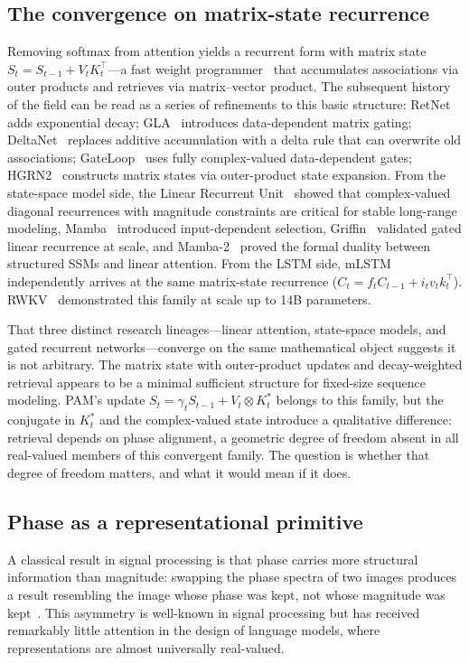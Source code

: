 \documentclass[11pt]{article}
\begin{document}
\subsection{The convergence on matrix-state recurrence}
Removing softmax from attention yields a recurrent form with matrix state $S_t = S_{t-1} + V_t K_t^\top$---a fast weight programmer~\cite{schmidhuber1992learning,schlag2021linear} that accumulates associations via outer products and retrieves via matrix--vector product. The subsequent history of the field can be read as a series of refinements to this basic structure: RetNet~\cite{sun2023retentive} adds exponential decay; GLA~\cite{yang2024gated} introduces data-dependent matrix gating; DeltaNet~\cite{yang2024deltanet} replaces additive accumulation with a delta rule that can overwrite old associations; GateLoop~\cite{katsch2024gateloop} uses fully complex-valued data-dependent gates; HGRN2~\cite{qin2024hgrn2} constructs matrix states via outer-product state expansion. From the state-space model side, the Linear Recurrent Unit~\cite{orvieto2023resurrecting} showed that complex-valued diagonal recurrences with magnitude constraints are critical for stable long-range modeling, Mamba~\cite{gu2023mamba} introduced input-dependent selection, Griffin~\cite{de2024griffin} validated gated linear recurrence at scale, and Mamba-2~\cite{dao2024transformers} proved the formal duality between structured SSMs and linear attention. From the LSTM side, mLSTM~\cite{beck2024xlstm} independently arrives at the same matrix-state recurrence ($C_t = f_t C_{t-1} + i_t v_t k_t^\top$). RWKV~\cite{peng2023rwkv,peng2024eagle} demonstrated this family at scale up to 14B parameters.

That three distinct research lineages---linear attention, state-space models, and gated recurrent networks---converge on the same mathematical object suggests it is not arbitrary. The matrix state with outer-product updates and decay-weighted retrieval appears to be a minimal sufficient structure for fixed-size sequence modeling. PAM's update $S_t = \gamma_t S_{t-1} + V_t \otimes K_t^*$ belongs to this family, but the conjugate in $K_t^*$ and the complex-valued state introduce a qualitative difference: retrieval depends on phase alignment, a geometric degree of freedom absent in all real-valued members of this convergent family. The question is whether that degree of freedom matters, and what it would mean if it does.

\subsection{Phase as a representational primitive}
A classical result in signal processing is that phase carries more structural information than magnitude: swapping the phase spectra of two images produces a result resembling the image whose phase was kept, not whose magnitude was kept~\cite{oppenheim1981importance}. This asymmetry is well-known in signal processing but has received remarkably little attention in the design of language models, where representations are almost universally real-valued.
\end{document}
